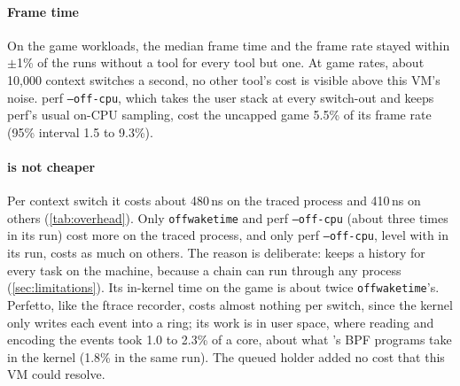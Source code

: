 \begin{table}[t]
\centering
\footnotesize

\caption{Overhead pilot (VM, three rounds of 15\,s per tool). Added time per
context switch is half the added time per \texttt{perf bench sched pipe}
round trip, against a baseline of about 4.2\,$\mu$s per switch; differences
of a few hundred nanoseconds are within this VM's noise. Slow frames caught
are over the game's own count inside the measured window. The ftrace and
Perfetto recorders and \texttt{perf sched} use no BPF; n/m: not measured.
$^\dagger$In 15\,s runs, where Perfetto's ring is far from full; a long
session would write more.}
\label{tab:overhead}
\end{table}

\paragraph{Frame time} On the game workloads, the median frame time and the
frame rate stayed within $\pm$1\% of the runs without a tool for every tool
but one. At game rates, about 10,000 context switches a second, no other
tool's cost is visible above this VM's noise. perf \texttt{--off-cpu}, which
takes the user stack at every switch-out and keeps perf's usual on-CPU
sampling, cost the uncapped game 5.5\% of its frame rate (95\% interval
1.5 to 9.3\%).

\paragraph{\sys is not cheaper} Per context switch it costs about 480\,ns
on the traced process and 410\,ns on others (\autoref{tab:overhead}). Only
\texttt{offwaketime} and perf \texttt{--off-cpu} (about three times \sys in
its run) cost more on the traced process, and only perf \texttt{--off-cpu},
level with \sys in its run, costs as much on others. The reason is
deliberate: \sys keeps a history for every task on the machine, because a
chain can run through any process (\autoref{sec:limitations}). Its
in-kernel time on the game is about twice \texttt{offwaketime}'s. Perfetto, like the ftrace recorder, costs
almost nothing per switch, since the kernel only writes each event into a
ring; its work is in user space, where reading and encoding the events
took 1.0 to 2.3\% of a core, about what \sys's BPF programs take in the
kernel (1.8\% in the same run). The queued holder added no cost that this
VM could resolve.

